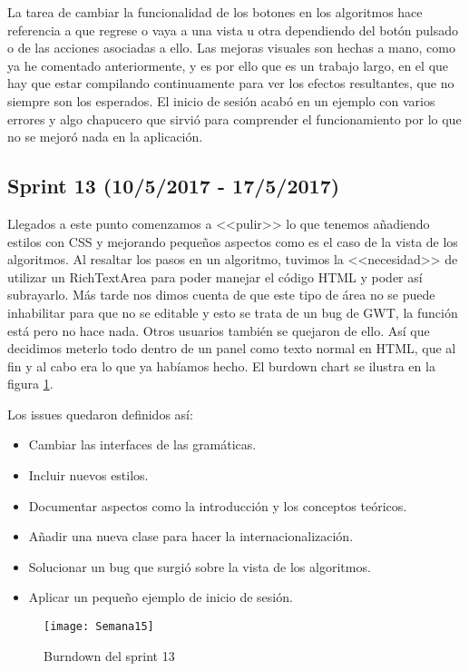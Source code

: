 La tarea de cambiar la funcionalidad de los botones en los algoritmos hace referencia a que regrese o vaya a una vista u otra dependiendo del botón pulsado o de las acciones asociadas a ello.
Las mejoras visuales son hechas a mano, como ya he comentado anteriormente, y es por ello que es un trabajo largo, en el que hay que estar compilando continuamente para ver los efectos resultantes, que no siempre son los esperados.
El inicio de sesión acabó en un ejemplo con varios errores y algo chapucero que sirvió para comprender el funcionamiento por lo que no se mejoró nada en la aplicación.

\subsection{Sprint 13 (10/5/2017 - 17/5/2017)}

Llegados a este punto comenzamos a <<pulir>> lo que tenemos añadiendo estilos con CSS y mejorando pequeños aspectos como es el caso de la vista de los algoritmos. Al resaltar los pasos en un algoritmo, tuvimos la <<necesidad>> de utilizar un RichTextArea para poder manejar el código HTML y poder así subrayarlo. Más tarde nos dimos cuenta de que este tipo de área no se puede inhabilitar para que no se editable y esto se trata de un bug de GWT, la función está pero no hace nada. Otros usuarios también se quejaron de ello. Así que decidimos meterlo todo dentro de un panel como texto normal en HTML, que al fin y al cabo era lo que ya habíamos hecho. El burdown chart se ilustra en la figura \ref{fig:A.12}.

Los issues quedaron definidos así:
\begin{itemize}
\item Cambiar las interfaces de las gramáticas.
\item Incluir nuevos estilos.
\item Documentar aspectos como la introducción y los conceptos teóricos.
\item Añadir una nueva clase para hacer la internacionalización.
\item Solucionar un bug que surgió sobre la vista de los algoritmos.
\item Aplicar un pequeño ejemplo de inicio de sesión.
\end{itemize}

\begin{figure}[h]
\centering
\texttt{[image: Semana15]}
\caption{Burndown del sprint 13}
\label{fig:A.12}
\end{figure}

